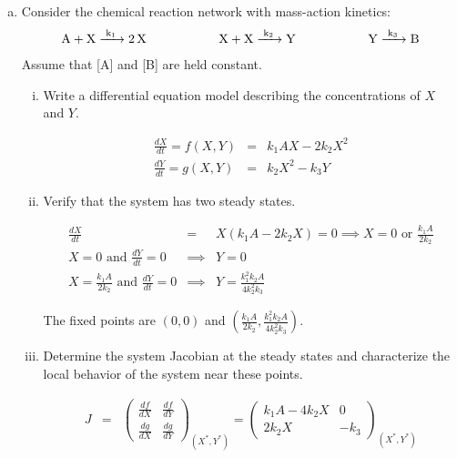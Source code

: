 \documentclass{article}
\begin{document}
\begin{enumerate}[a)]
\setlength{\itemsep}{0pt}
\item Consider the chemical reaction network with mass-action kinetics:
\begin{eqnarray*}
\ce{A + X ->[k_1] 2 X} \hspace{2 cm} \ce{X + X ->[k_2] Y}  \hspace{2 cm} \ce{Y ->[k_3] B} 
\end{eqnarray*}
Assume that [A] and [B] are held constant.
\begin{enumerate}[i)]
\setlength{\itemsep}{0pt}
\item Write a differential equation model describing the concentrations of $X$ and $Y$.\\

{\color{red}

\begin{eqnarray*}
\frac{dX}{dt} = f(X,Y) & = & k_1A X - 2 k_2 X^2\\
\frac{dY}{dt} = g(X,Y) & = & k_2 X^2 - k_3 Y
\end{eqnarray*}

}

\item Verify that the system has two steady states.\\

{\color{red}

\begin{eqnarray*}
\frac{dX}{dt} & = & X \left( k_1A - 2 k_2 X \right) = 0 \implies X = 0 \textrm{ or } \frac{k_1A}{2k_2}\\
X = 0 \textrm{ and } \frac{dY}{dt}=0 & \implies & Y=0\\
X =  \frac{k_1A}{2k_2} \textrm{ and } \frac{dY}{dt}=0 & \implies & Y = \frac{k_1^2 k_2 A}{4 k_2^2 k_3}
\end{eqnarray*}

The fixed points are $(0,0)$ and $(\frac{k_1A}{2k_2}, \frac{k_1^2 k_2 A}{4 k_2^2 k_3})$.

}


\item Determine the system Jacobian at the steady states and characterize the local behavior of the system near these points.\\

{\color{red}

\begin{eqnarray*}
J & = & \begin{pmatrix} \frac{df}{dX} & \frac{df}{dY}\\ \frac{dg}{dX} & \frac{dg}{dY} \end{pmatrix}_{(X^*, Y^*)} = \begin{pmatrix} k_1 A -4 k_2 X & 0\\ 2k_2 X & - k_3 \end{pmatrix}_{(X^*, Y^*)}
\end{eqnarray*}

}
\end{enumerate}
\end{enumerate}
\end{document}
